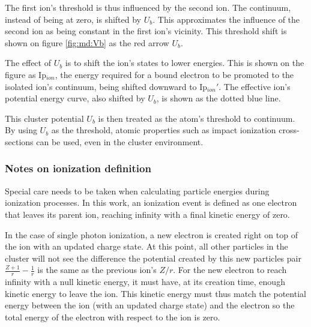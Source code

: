 The first ion's threshold is thus influenced by the second ion. The continuum,
instead of being at zero, is shifted by $U_b$. This approximates the
influence of the second ion as being constant in the first ion's vicinity. This
threshold shift is shown on figure \ref{fig:md:Vb} as the red arrow $U_b$.

The effect of $U_b$ is to shift the ion's states to lower energies. This is
shown on the figure as Ip$_{ion}$, the energy required for a bound electron
to be promoted to the isolated ion's continuum, being shifted downward to
Ip$_{ion}'$. The effective ion's potential energy curve, also shifted by $U_b$,
is shown as the dotted blue line.

This cluster potential $U_b$ is then treated as the atom's threshold
to continuum. By using $U_b$ as the threshold, atomic properties such as
impact ionization cross-sections can be used, even in the cluster environment.



\subsubsection{Notes on ionization definition}
\label{section:intro:mechanisms:notes}

Special care needs to be taken when calculating particle energies during
ionization processes. In this work, an ionization event is defined as one
electron that leaves its parent ion, reaching infinity with a final kinetic
energy of zero.



In the case of single photon ionization, a new electron is created right on top
of the ion with an updated charge state. At this point, all other particles in
the cluster will not see the difference the potential created by this new
particles pair $\frac{Z+1}{r} - \frac{1}{r}$ is the same as the previous ion's
$Z/r$.
%
For the new electron to reach infinity with a null kinetic energy, it
must have, at its creation time, enough kinetic energy to leave the ion. This
kinetic energy must thus match the potential energy between the ion (with an
updated charge state) and the electron so the total energy of the electron with
respect to the ion is zero.

